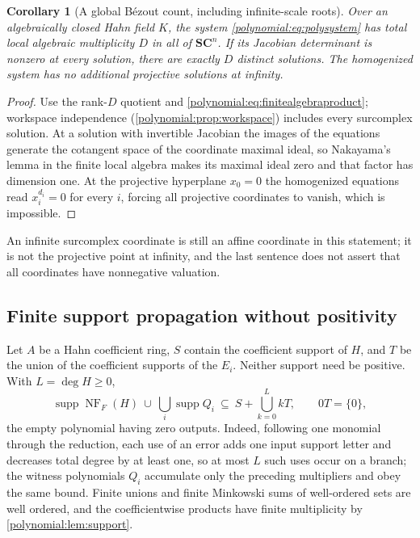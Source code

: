 \documentclass[11pt,letterpaper]{article}
\numberwithin{equation}{section}
\newtheorem{corollary}[theorem]{Corollary}
\theoremstyle{definition}
\theoremstyle{remark}\newtheorem{remark}[theorem]{Remark}
\newcommand{\SC}{\mathbf{SC}}
\newcommand{\supp}{\operatorname{supp}}
\newcommand{\NF}{\operatorname{NF}}
\begin{document}
\begin{corollary}[A global B\'ezout count, including infinite-scale roots]
\label{polynomial:cor:globalbezout}
Over an algebraically closed Hahn field $K$, the system
\eqref{polynomial:eq:polysystem} has total local algebraic multiplicity $D$ in
all of $\SC^n$. If its Jacobian determinant is nonzero at every solution,
there are exactly $D$ distinct solutions. The homogenized system has no
additional projective solutions at infinity.
\end{corollary}
\begin{proof}
Use the rank-$D$ quotient and
\eqref{polynomial:eq:finitealgebraproduct}; workspace independence
(\cref{polynomial:prop:workspace}) includes every surcomplex solution. At a
solution with invertible Jacobian the images of the equations generate the
cotangent space of the coordinate maximal ideal, so Nakayama's lemma in the
finite local algebra makes its maximal ideal zero and that factor has
dimension one. At the projective hyperplane $x_0=0$ the homogenized equations
read $x_i^{d_i}=0$ for every $i$, forcing all projective coordinates to
vanish, which is impossible.
\end{proof}

An infinite surcomplex coordinate is still an affine coordinate in this
statement; it is not the projective point at infinity, and the last sentence
does not assert that all coordinates have nonnegative valuation.

\subsection{Finite support propagation without positivity}
Let $A$ be a Hahn coefficient ring, $S$ contain the coefficient support of
$H$, and $T$ be the union of the coefficient supports of the $E_i$. Neither
support need be positive. With $L=\deg H\ge0$,
\begin{equation}\label{polynomial:eq:finitepolysupport}
 \supp\NF_F(H)\ \cup\ \bigcup_i\supp Q_i
 \ \subseteq\ S+\bigcup_{k=0}^LkT,\qquad 0T=\{0\},
\end{equation}
the empty polynomial having zero outputs. Indeed, following one monomial
through the reduction, each use of an error adds one input support letter and
decreases total degree by at least one, so at most $L$ such uses occur on a
branch; the witness polynomials $Q_i$ accumulate only the preceding
multipliers and obey the same bound. Finite unions and finite Minkowski sums
of well-ordered sets are well ordered, and the coefficientwise products have
finite multiplicity by \cref{polynomial:lem:support}.
\end{document}

